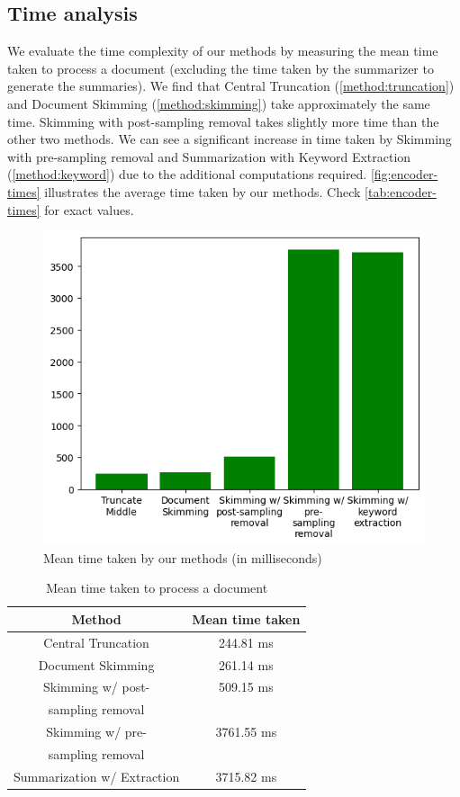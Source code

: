\subsection*{Time analysis}

We evaluate the time complexity of our methods by measuring the mean time taken to process a
document (excluding the time taken by the summarizer to generate the summaries).
We find that Central Truncation (\ref{method:truncation}) and Document Skimming
(\ref{method:skimming}) take approximately the same time.
Skimming with post-sampling removal takes slightly more time than the other two methods.
We can see a significant increase in time taken by Skimming with pre-sampling removal and Summarization
with Keyword Extraction (\ref{method:keyword}) due to the additional computations required.
\autoref{fig:encoder-times} illustrates the average time taken by our methods.
Check \autoref{tab:encoder-times} for exact values.

\begin{figure}[!ht]
	\centering
	\includegraphics[width=.48\textwidth]{Images/encoder-times.png}
	\caption{Mean time taken by our methods (in milliseconds)}
	\label{fig:encoder-times}
\end{figure}

\begin{table}[!ht]
	\centering

	\begin{tabular}{c c}
		\hline
		Method & Mean time taken \\
		\hline
		Central Truncation & 244.81 ms \\
		Document Skimming & 261.14 ms \\
		Skimming w/ post- & 509.15 ms \\
		sampling removal & \\
		Skimming w/ pre- & 3761.55 ms \\
		sampling removal & \\
		Summarization w/ Extraction & 3715.82 ms \\
		\hline
	\end{tabular}

	\caption{Mean time taken to process a document}
	\label{tab:encoder-times}
\end{table}
